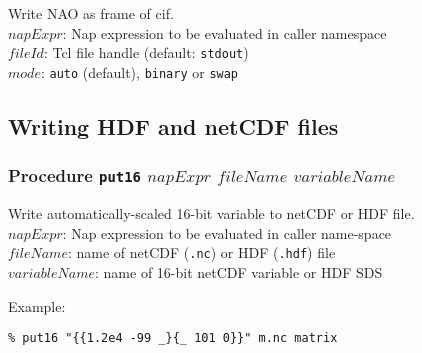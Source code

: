   Write NAO as frame of cif.
  \\
  $napExpr$: Nap expression to be evaluated in caller
  namespace
  \\
  $\mathit{fileId}$: Tcl file handle (default: 
  \texttt{stdout})
  \\
  $\mathit{mode}$: 
  \texttt{auto} (default), 
  \texttt{binary} or 
  \texttt{swap}

\subsection{Writing HDF and netCDF files}
    \label{bin-io-hdf-netcdf}

\subsubsection{Procedure \texttt{put16} $napExpr$ $\mathit{fileName}$ $\mathit{variableName}$}
    \label{bin-io-put16}

  Write automatically-scaled 16-bit variable to netCDF or HDF
  file.
  \\
  $napExpr$: Nap expression to be evaluated in caller
  name-space
  \\
  $\mathit{fileName}$: name of netCDF (\texttt{.nc}) or HDF (\texttt{.hdf}) file
  \\
  $\mathit{variableName}$: name of 16-bit netCDF variable or HDF SDS
  

Example:
  \begin{verbatim}
% put16 "{{1.2e4 -99 _}{_ 101 0}}" m.nc matrix
\end{verbatim}
